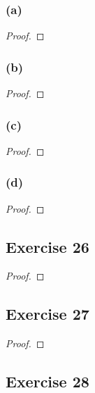 \documentclass[14pt]{extarticle}
\begin{document}
\subsubsection{(a)}

\begin{proof}

\end{proof}

\subsubsection{(b)}

\begin{proof}

\end{proof}

\subsubsection{(c)}

\begin{proof}

\end{proof}

\subsubsection{(d)}

\begin{proof}

\end{proof}

\subsection{Exercise 26}

\begin{proof}

\end{proof}

\subsection{Exercise 27}

\begin{proof}

\end{proof}

\subsection{Exercise 28}
\end{document}
